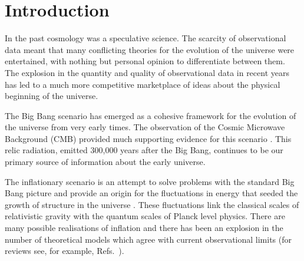 \renewcommand{\CVSrevision}%
{\version$Id: shortintro.tex,v 1.9 2009/11/27 15:03:27 ith Exp $}

\chapter{Introduction}
\label{ch:shortintro}
In the past cosmology was a speculative science. The scarcity of observational
data meant that many conflicting theories for the evolution of the universe were
entertained, with nothing but personal opinion to differentiate between them.
The explosion in the quantity and quality of observational data in recent years
has led to a much more competitive marketplace of ideas about the physical
beginning of the universe.

The Big Bang scenario has emerged as a cohesive framework for the evolution of
the universe from very early times. The observation of the Cosmic
Microwave Background (CMB) provided much supporting evidence for this scenario
\cite{book:kolbturner}. This
relic radiation, emitted 300,000 years after the Big Bang, continues to
be our primary source of information about the early universe.

The inflationary scenario is an attempt to solve problems with the standard Big
Bang picture and provide an origin for the fluctuations in energy that seeded
the growth of structure in the universe
\cite{Starobinsky:1980te,Guth:1980zm,Albrecht:1982wi,Linde:1981mu,
Starobinsky:1982ee}. These fluctuations link the classical scales of
relativistic gravity with the quantum scales of Planck level physics. There are
many possible realisations of inflation and there has been an explosion in the
number of theoretical models which agree with current observational limits
(for reviews see, for example, Refs.~\cite{book:liddle, Alabidi:2008ej,
Baumann2009}).

